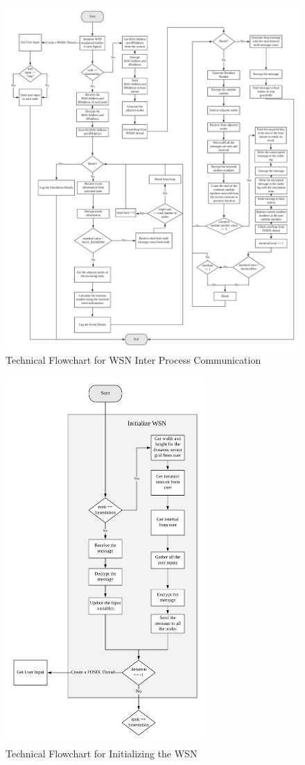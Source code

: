 \documentclass[conference]{IEEEtran}
\begin{document}
	
	\begin{figure}[!ht]
		\centering
		\includegraphics[width=6in]{arc}
		\caption{Technical Flowchart for WSN Inter Process Communication}
		\label{arc}
	\end{figure}
	
			\begin{figure}[!ht]
		\centering
		\includegraphics[width=3in]{inWSN}
		\caption{Technical Flowchart for Initializing the WSN}
		\label{inWSN}
	\end{figure}
	
\end{document}
